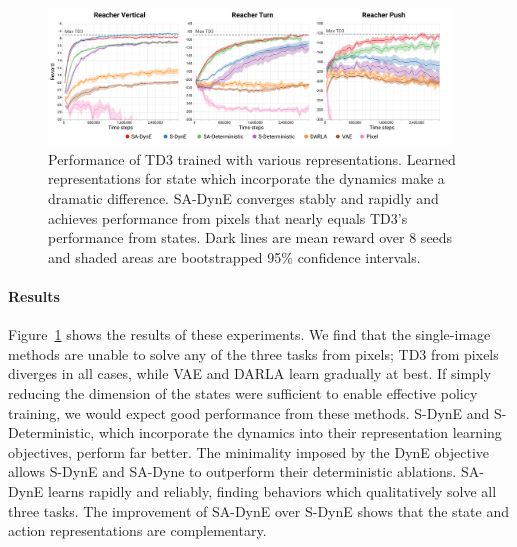 

\begin{figure}[t]
\centering
\includegraphics[width=0.95\textwidth]{figures/dyne/pixels_results_sdet.png}
\caption{Performance of TD3 trained with various representations.
Learned representations for state which incorporate the dynamics make a dramatic difference.
SA-DynE converges stably and rapidly and achieves performance from pixels that nearly equals TD3's performance from states.
Dark lines are mean reward over 8 seeds and shaded areas are bootstrapped 95\% confidence intervals.}
\label{fig:pixel_results}
\end{figure}

\paragraph{Results}
Figure~\ref{fig:pixel_results} shows the results of these experiments.
We find that the single-image methods are unable to solve any of the three tasks from pixels; TD3 from pixels diverges in all cases, while VAE and DARLA learn gradually at best.
If simply reducing the dimension of the states were sufficient to enable effective policy training, we would expect good performance from these methods.
S-DynE and S-Deterministic, which incorporate the dynamics into their representation learning objectives, perform far better.
The minimality imposed by the DynE objective allows S-DynE and SA-Dyne to outperform their deterministic ablations.
SA-DynE learns rapidly and reliably, finding behaviors which qualitatively solve all three tasks.
The improvement of SA-DynE over S-DynE shows that the state and action representations are complementary.

